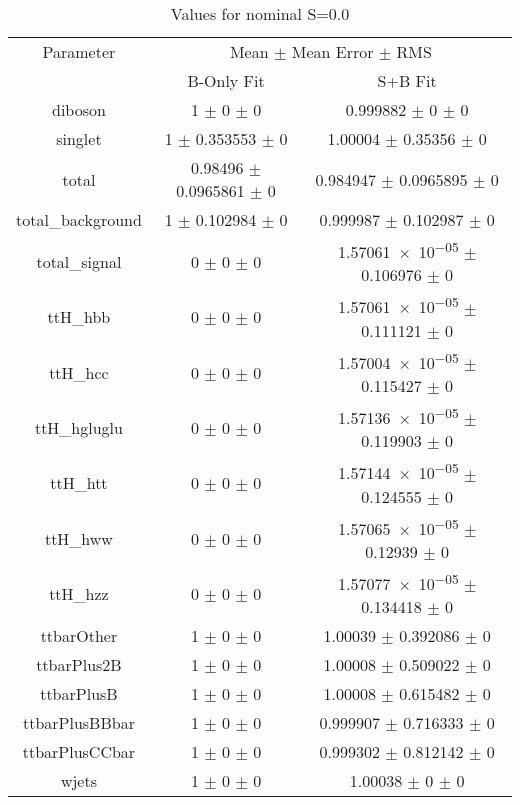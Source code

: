 \begin{table}
\centering
\caption{Values for nominal S=0.0}
\begin{tabular}{ccc}
\toprule
Parameter & \multicolumn{2}{c}{Mean $\pm$ Mean Error $\pm$ RMS}\\
 & B-Only Fit & S+B Fit\\
\midrule
diboson & \num{1} $\pm$ \num{0} $\pm$ \num{0} & \num{0.999882} $\pm$ \num{0} $\pm$ \num{0}\\
singlet & \num{1} $\pm$ \num{0.353553} $\pm$ \num{0} & \num{1.00004} $\pm$ \num{0.35356} $\pm$ \num{0}\\
total & \num{0.98496} $\pm$ \num{0.0965861} $\pm$ \num{0} & \num{0.984947} $\pm$ \num{0.0965895} $\pm$ \num{0}\\
total\_background & \num{1} $\pm$ \num{0.102984} $\pm$ \num{0} & \num{0.999987} $\pm$ \num{0.102987} $\pm$ \num{0}\\
total\_signal & \num{0} $\pm$ \num{0} $\pm$ \num{0} & \num{1.57061e-05} $\pm$ \num{0.106976} $\pm$ \num{0}\\
ttH\_hbb & \num{0} $\pm$ \num{0} $\pm$ \num{0} & \num{1.57061e-05} $\pm$ \num{0.111121} $\pm$ \num{0}\\
ttH\_hcc & \num{0} $\pm$ \num{0} $\pm$ \num{0} & \num{1.57004e-05} $\pm$ \num{0.115427} $\pm$ \num{0}\\
ttH\_hgluglu & \num{0} $\pm$ \num{0} $\pm$ \num{0} & \num{1.57136e-05} $\pm$ \num{0.119903} $\pm$ \num{0}\\
ttH\_htt & \num{0} $\pm$ \num{0} $\pm$ \num{0} & \num{1.57144e-05} $\pm$ \num{0.124555} $\pm$ \num{0}\\
ttH\_hww & \num{0} $\pm$ \num{0} $\pm$ \num{0} & \num{1.57065e-05} $\pm$ \num{0.12939} $\pm$ \num{0}\\
ttH\_hzz & \num{0} $\pm$ \num{0} $\pm$ \num{0} & \num{1.57077e-05} $\pm$ \num{0.134418} $\pm$ \num{0}\\
ttbarOther & \num{1} $\pm$ \num{0} $\pm$ \num{0} & \num{1.00039} $\pm$ \num{0.392086} $\pm$ \num{0}\\
ttbarPlus2B & \num{1} $\pm$ \num{0} $\pm$ \num{0} & \num{1.00008} $\pm$ \num{0.509022} $\pm$ \num{0}\\
ttbarPlusB & \num{1} $\pm$ \num{0} $\pm$ \num{0} & \num{1.00008} $\pm$ \num{0.615482} $\pm$ \num{0}\\
ttbarPlusBBbar & \num{1} $\pm$ \num{0} $\pm$ \num{0} & \num{0.999907} $\pm$ \num{0.716333} $\pm$ \num{0}\\
ttbarPlusCCbar & \num{1} $\pm$ \num{0} $\pm$ \num{0} & \num{0.999302} $\pm$ \num{0.812142} $\pm$ \num{0}\\
wjets & \num{1} $\pm$ \num{0} $\pm$ \num{0} & \num{1.00038} $\pm$ \num{0} $\pm$ \num{0}\\
\bottomrule
\end{tabular}
\end{table}